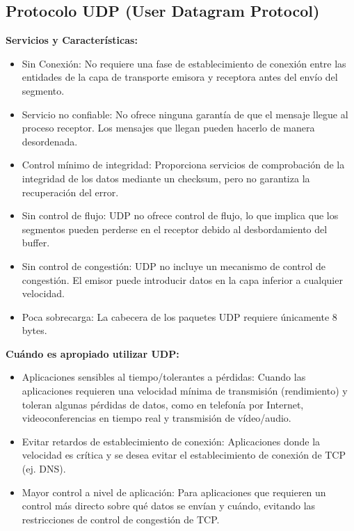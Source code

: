 \begin{enumerate}
    
    \subsection*{Protocolo UDP (User Datagram Protocol)}
    
    \textbf{Servicios y Características:}
    \begin{itemize}
        \item Sin Conexión: No requiere una fase de establecimiento de conexión entre las entidades de la capa de transporte emisora y receptora antes del envío del segmento.
        \item Servicio no confiable: No ofrece ninguna garantía de que el mensaje llegue al proceso receptor. Los mensajes que llegan pueden hacerlo de manera desordenada.
        \item Control mínimo de integridad: Proporciona servicios de comprobación de la integridad de los datos mediante un checksum, pero no garantiza la recuperación del error.
        \item Sin control de flujo: UDP no ofrece control de flujo, lo que implica que los segmentos pueden perderse en el receptor debido al desbordamiento del buffer.
        \item Sin control de congestión: UDP no incluye un mecanismo de control de congestión. El emisor puede introducir datos en la capa inferior a cualquier velocidad.
        \item Poca sobrecarga: La cabecera de los paquetes UDP requiere únicamente 8 bytes.
    \end{itemize}
    
    \textbf{Cuándo es apropiado utilizar UDP:}
    \begin{itemize}
        \item Aplicaciones sensibles al tiempo/tolerantes a pérdidas: Cuando las aplicaciones requieren una velocidad mínima de transmisión (rendimiento) y toleran algunas pérdidas de datos, como en telefonía por Internet, videoconferencias en tiempo real y transmisión de vídeo/audio.
        \item Evitar retardos de establecimiento de conexión: Aplicaciones donde la velocidad es crítica y se desea evitar el establecimiento de conexión de TCP (ej. DNS).
        \item Mayor control a nivel de aplicación: Para aplicaciones que requieren un control más directo sobre qué datos se envían y cuándo, evitando las restricciones de control de congestión de TCP.
    \end{itemize}
    

\end{enumerate}
